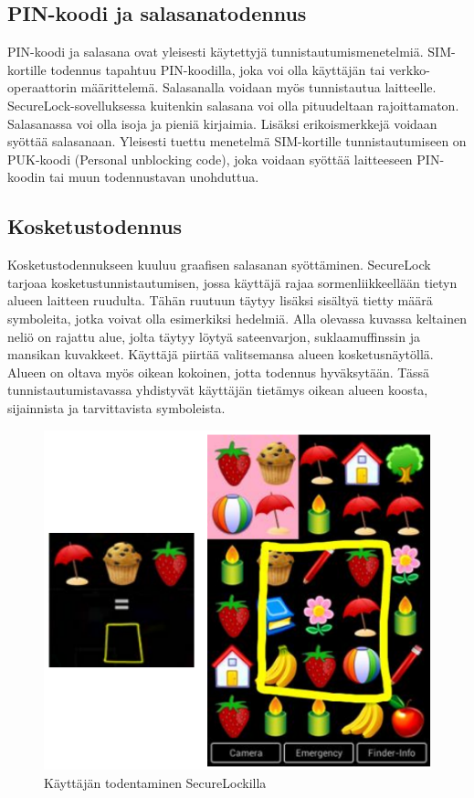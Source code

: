 \documentclass[finnish]{tktltiki2}
\theoremstyle{definition}
\theoremstyle{remark}
\begin{document}
\subsection{PIN-koodi ja salasanatodennus}

PIN-koodi ja salasana ovat yleisesti käytettyjä tunnistautumismenetelmiä. SIM-kortille todennus tapahtuu PIN-koodilla, joka voi olla käyttäjän tai verkko-operaattorin määrittelemä. Salasanalla voidaan myös tunnistautua laitteelle. SecureLock-sovelluksessa kuitenkin salasana voi olla pituudeltaan rajoittamaton. Salasanassa voi olla isoja ja pieniä kirjaimia. Lisäksi erikoismerkkejä voidaan syöttää salasanaan. Yleisesti tuettu menetelmä SIM-kortille tunnistautumiseen on PUK-koodi (Personal unblocking code), joka voidaan syöttää laitteeseen PIN-koodin tai muun todennustavan unohduttua.

\subsection{Kosketustodennus}

Kosketustodennukseen kuuluu graafisen salasanan syöttäminen. SecureLock tarjoaa kosketustunnistautumisen, jossa käyttäjä rajaa sormenliikkeellään tietyn alueen laitteen ruudulta. Tähän ruutuun täytyy lisäksi sisältyä tietty määrä symboleita, jotka voivat olla esimerkiksi hedelmiä. Alla olevassa kuvassa keltainen neliö on rajattu alue, jolta täytyy löytyä sateenvarjon, suklaamuffinssin ja mansikan kuvakkeet. Käyttäjä piirtää valitsemansa alueen kosketusnäytöllä. Alueen on oltava myös oikean kokoinen, jotta todennus hyväksytään. Tässä tunnistautumistavassa yhdistyvät käyttäjän tietämys oikean alueen koosta, sijainnista ja tarvittavista symboleista.


\begin{figure}[h!]
\centering
	\includegraphics[scale=0.5]{gesture}
\caption{Käyttäjän todentaminen SecureLockilla \cite{secure}}
\end{figure}
\end{document}
